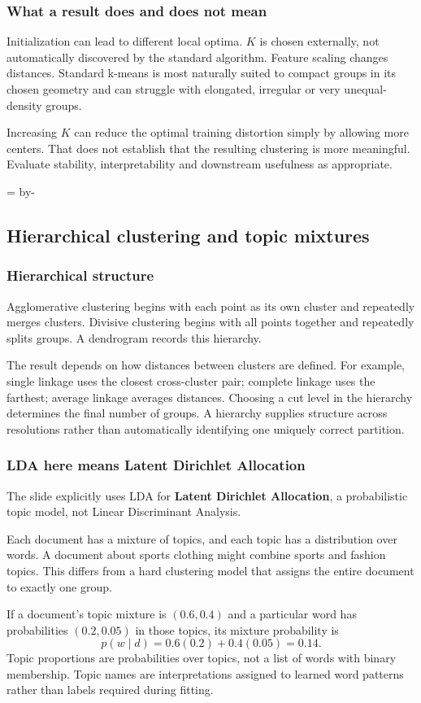 \documentclass[11pt]{article}
\newcommand{\newsubsection}[1]{\par\begingroup\skip0=\pagegoal\advance\skip0 by-\pagetotal\ifdim\skip0<12\baselineskip\newpage\fi\endgroup\subsection{#1}}
\begin{document}
\subsubsection{What a result does and does not mean}
Initialization can lead to different local optima. $K$ is chosen externally, not automatically discovered by the standard algorithm. Feature scaling changes distances. Standard k-means is most naturally suited to compact groups in its chosen geometry and can struggle with elongated, irregular or very unequal-density groups.

Increasing $K$ can reduce the optimal training distortion simply by allowing more centers. That does not establish that the resulting clustering is more meaningful. Evaluate stability, interpretability and downstream usefulness as appropriate.

\newsubsection{Hierarchical clustering and topic mixtures}
\subsubsection{Hierarchical structure}
Agglomerative clustering begins with each point as its own cluster and repeatedly merges clusters. Divisive clustering begins with all points together and repeatedly splits groups. A dendrogram records this hierarchy.

The result depends on how distances between clusters are defined. For example, single linkage uses the closest cross-cluster pair; complete linkage uses the farthest; average linkage averages distances. Choosing a cut level in the hierarchy determines the final number of groups. A hierarchy supplies structure across resolutions rather than automatically identifying one uniquely correct partition.

\subsubsection{LDA here means Latent Dirichlet Allocation}
The slide explicitly uses LDA for \textbf{Latent Dirichlet Allocation}, a probabilistic topic model, not Linear Discriminant Analysis.

Each document has a mixture of topics, and each topic has a distribution over words. A document about sports clothing might combine sports and fashion topics. This differs from a hard clustering model that assigns the entire document to exactly one group.

If a document's topic mixture is $(0.6,0.4)$ and a particular word has probabilities $(0.2,0.05)$ in those topics, its mixture probability is
\[
p(w\mid d)=0.6(0.2)+0.4(0.05)=0.14.
\]
Topic proportions are probabilities over topics, not a list of words with binary membership. Topic names are interpretations assigned to learned word patterns rather than labels required during fitting.
\end{document}

